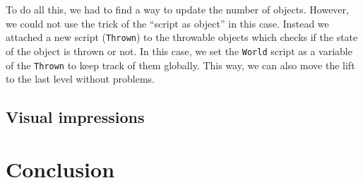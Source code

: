 \documentclass[a4paper]{article}
\begin{document}
To do all this, we had to find a way to update the number of objects.
However, we could not use the trick of the ``script as object'' in this case.
Instead we attached a new script (\verb!Thrown!) to the throwable objects which
checks if the state of the object is thrown or not. In this case, we set the
\verb!World! script as a variable of the \verb!Thrown! to keep track of them
globally. This way, we can also move the lift to the last level without problems.

\subsection{Visual impressions}





\section{Conclusion}




\end{document}
